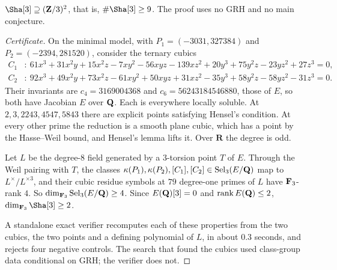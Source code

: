 \begin{theorem}\label{thm:sha3lower}
$\Sha[3]\supseteq(\Z/3)^2$, that is, $\#\Sha[3]\ge9$. The proof uses no GRH and no main conjecture.
\end{theorem}
\begin{proof}[Certificate]
On the minimal model, with $P_1=(-3031,327384)$ and $P_2=(-2394,281520)$, consider the ternary cubics
\begin{align*}
C_1&:\ 61x^3+31x^2y+15x^2z-7xy^2-56xyz-139xz^2+20y^3+75y^2z-23yz^2+27z^3=0,\\
C_2&:\ 92x^3+49x^2y+73x^2z-61xy^2+50xyz+31xz^2-35y^3+58y^2z-58yz^2-31z^3=0.
\end{align*}
Their invariants are $c_4=3169004368$ and $c_6=56243184546880$, those of $E$, so both have Jacobian $E$ over $\mathbf{Q}$. Each is everywhere locally soluble. At $2,3,2243,4547,5843$ there are explicit points satisfying Hensel's condition. At every other prime the reduction is a smooth plane cubic, which has a point by the Hasse--Weil bound, and Hensel's lemma lifts it. Over $\mathbf{R}$ the degree is odd.

Let $L$ be the degree-$8$ field generated by a $3$-torsion point $T$ of $E$. Through the Weil pairing with $T$, the classes $\kappa(P_1),\kappa(P_2),[C_1],[C_2]\in\operatorname{Sel}_3(E/\mathbf{Q})$ map to $L^\times/L^{\times3}$, and their cubic residue symbols at $79$ degree-one primes of $L$ have $\mathbf{F}_3$-rank $4$. So $\dim_{\mathbf{F}_3}\operatorname{Sel}_3(E/\mathbf{Q})\ge4$. Since $E(\mathbf{Q})[3]=0$ and $\operatorname{rank} E(\mathbf{Q})\le2$, $\dim_{\F_3}\Sha[3]\ge2$.

A standalone exact verifier recomputes each of these properties from the two cubics, the two points and a defining polynomial of $L$, in about $0.3$ seconds, and rejects four negative controls. The search that found the cubics used class-group data conditional on GRH; the verifier does not.
\end{proof}

